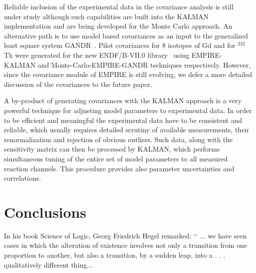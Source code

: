 \documentclass[twocolumn,amsmath,amssymb,10pt,groupedaddress,a4paper]{revtex4}
\begin{document}
Reliable inclusion of the experimental data in the covariance analysis is still under study although such capabilities are built into the KALMAN implementation and are being developed for the Monte Carlo approach.
An alternative path is to use model based covariances as an input to the generalized least square system GANDR~\cite{GANDR}. Pilot covariances for 8 isotopes of Gd and for $^{232}$Th were generated for the new ENDF/B-VII.0 library~\cite{ENDF-VII} using EMPIRE-KALMAN and Monte-Carlo-EMPIRE-GANDR techniques respectively. However, since the covariance module of EMPIRE is still evolving, we defer a more detailed discussion of the covariances to the future paper.

A by-product of generating covariances with the KALMAN approach is a very powerful technique for adjusting model parameters to experimental data. In order to be efficient and meaningful the experimental data have to be consistent and reliable, which usually requires detailed scrutiny of available measurements, their renormalization and rejection of obvious outliers. Such data, along with the sensitivity matrix can then be processed by KALMAN, which performs simultaneous tuning of the entire set of model parameters to all measured reaction channels. This procedure provides also parameter uncertainties and correlations.




\section{Conclusions}

In his book Science of Logic, Georg Friedrich Hegel remarked:
‘‘
... we have seen cases in which the alteration of existence
involves not only a transition from one proportion to another,
but also a transition, by a sudden leap, into a . . . qualitatively
different thing...
\end{document}
